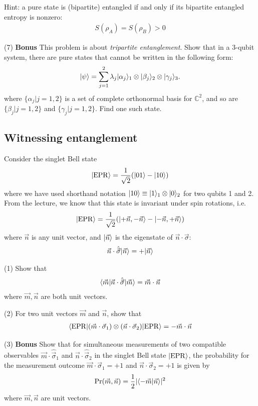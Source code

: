 Hint: a pure state is (bipartite) entangled if and only if its bipartite entangled entropy is nonzero:
\begin{align}
S(\rho_A)=S(\rho_B)>0
\end{align}

(7) \textbf{Bonus} This problem is about \emph{tripartite entanglement}. Show that in a 3-qubit system, there are pure states that cannot be written in the following form:
\begin{align}
|{\psi}\rangle=\sum_{j=1}^2\lambda_{j}|{\alpha_j}\rangle_1\otimes|{\beta_j}\rangle_2\otimes|{\gamma_j}\rangle_3.
\end{align}
where $\{\alpha_j|j=1,2\}$ is a set of complete orthonormal basis for $\mathbb{C}^2$, and so are $\{\beta_j|j=1,2\}$ and $\{\gamma_j|j=1,2\}$. Find one such state. 


\subsection{Witnessing entanglement}

Consider the singlet Bell state
\begin{align}
    |{\mathrm{EPR}}\rangle=\frac1{\sqrt2}(|{01}\rangle-|{10}\rangle)
\end{align}
where we have used shorthand notation $|{10}\rangle\equiv|{1}\rangle_1\otimes|{0}\rangle_2$ for two qubits 1 and 2. From the lecture, we know that this state is invariant under spin rotations, i.e. 
\begin{align}
    |{\mathrm{EPR}}\rangle=\frac1{\sqrt2}(|{+\vec n,-\vec n}\rangle-|{-\vec n,+\vec n}\rangle)
\end{align}
where $\vec n$ is any unit vector, and $|{\vec n}\rangle$ is the eigenstate of $\vec n\cdot\vec\sigma$:
\begin{align}
    \vec n\cdot\hat{\vec\sigma}|{\vec n}\rangle=+|{\vec n}\rangle
\end{align}

(1) Show that 
\begin{align}
    \langle{\vec m|\vec n\cdot\hat{\vec\sigma}|\vec m}\rangle=\vec m\cdot\vec n
\end{align}
where $\vec m,\vec n$ are both unit vectors. 

(2) For two unit vectors $\vec m$ and $\vec n$, show that
\begin{align}
    \langle{\mathrm{EPR}|(\vec m\cdot\vec\sigma_1)\otimes(\vec n\cdot\vec\sigma_2)|\mathrm{EPR}}\rangle=-\vec m\cdot\vec n
\end{align}

(3) \textbf{Bonus} Show that for simultaneous measurements of two compatible observables $\vec m\cdot\hat{\vec\sigma}_1$ and $\vec n\cdot\hat{\vec\sigma}_2$ in the singlet Bell state $|{\mathrm{EPR}}\rangle$, the probability for the measurement outcome $\vec m\cdot\vec\sigma_1=+1$ and $\vec n\cdot\vec\sigma_2=+1$ is given by
\begin{align}
    \text{Pr}(\vec m,\vec n)=\frac12|\langle{-\vec m|\vec n}\rangle|^2
\end{align}
where $\vec m,\vec n$ are unit vectors. 

